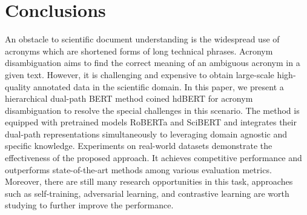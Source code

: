 \section{Conclusions}
\label{sec:conclusion}
An obstacle to scientific document understanding is the widespread use of acronyms which are shortened forms of long technical phrases.
Acronym disambiguation aims to find the correct meaning of an ambiguous acronym in a given text.
However, it is challenging and expensive to obtain large-scale high-quality annotated data in the scientific domain.
In this paper, we present a hierarchical dual-path BERT method coined hdBERT for acronym disambiguation to resolve the special challenges in this scenario.
The method is equipped with pretrained models RoBERTa and SciBERT and integrates their dual-path representations simultaneously to leveraging domain agnostic and specific knowledge.
Experiments on real-world datasets demonstrate the effectiveness of the proposed approach.
It achieves competitive performance and outperforms state-of-the-art methods among various evaluation metrics.
Moreover, there are still many research opportunities in this task, approaches such as self-training, adversarial learning, and contrastive learning are worth studying to further improve the performance.